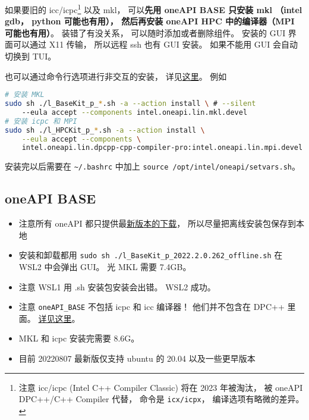 

如果要旧的 icc/icpc\footnote{注意 icc/icpc (Intel C++ Compiler Classic) 将在 2023 年被淘汰， 被 oneAPI DPC++/C++ Compiler 代替， 命令是 \verb|icx/icpx|， 编译选项有略微的差异。} 以及 mkl， 可以\textbf{先用 oneAPI BASE 只安装 mkl （intel gdb， python 可能也有用）， 然后再安装 oneAPI HPC 中的编译器（MPI 可能也有用）}。
装错了有没关系， 可以随时添加或者删除组件。 安装的 GUI 界面可以通过 X11 传输， 所以远程 ssh 也有 GUI 安装。 如果不能用 GUI 会自动切换到 TUI。

也可以通过命令行选项进行非交互的安装， 详见\href{https://www.intel.com/content/www/us/en/develop/documentation/installation-guide-for-intel-oneapi-toolkits-linux/top/installation/install-with-command-line.html#install-with-command-line}{这里}。 例如
\begin{lstlisting}[language=bash]
# 安装 MKL
sudo sh ./l_BaseKit_p_*.sh -a --action install \ # --silent
    --eula accept --components intel.oneapi.lin.mkl.devel
# 安装 icpc 和 MPI
sudo sh ./l_HPCKit_p_*.sh -a --action install \
    --eula accept --components \
    intel.oneapi.lin.dpcpp-cpp-compiler-pro:intel.oneapi.lin.mpi.devel
\end{lstlisting}

安装完以后需要在 \verb|~/.bashrc| 中加上 \verb|source /opt/intel/oneapi/setvars.sh|。

\subsection{oneAPI BASE}
\begin{itemize}
\item 注意所有 oneAPI 都只提供最\href{https://www.intel.com/content/www/us/en/developer/tools/oneapi/base-toolkit-download.html?operatingsystem=linux&distributions=webdownload&options=offline}{新版本的下载}， 所以尽量把离线安装包保存到本地
\item 安装和卸载都用 \verb`sudo sh ./l_BaseKit_p_2022.2.0.262_offline.sh` 在 WSL2 中会弹出 GUI。 光 MKL 需要 7.4GB。
\item 注意 WSL1 用 .sh 安装包安装会出错。 WSL2 成功。
\item 注意 \verb|oneAPI_BASE| 不包括 icpc 和 icc 编译器！ 他们并不包含在 DPC++ 里面。 \href{https://stackoverflow.com/questions/66527842/can-not-find-the-icc-compiler-after-having-installed-intel-oneapi-invoking-from}{详见这里}。
\item MKL 和 icpc 安装完需要 8.6G。
\item 目前 20220807 最新版仅支持 ubuntu 的 20.04 以及一些更早版本
\end{itemize}

